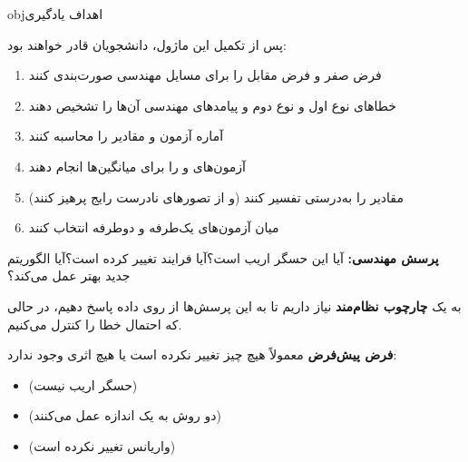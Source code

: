 \begin{PSbox}[unbreakable]{obj}{اهداف یادگیری}

پس از تکمیل این ماژول، دانشجویان قادر خواهند بود:

\begin{enumerate}
\def\labelenumi{\arabic{enumi}.}
\tightlist
\item
  فرض صفر و فرض مقابل را برای مسایل مهندسی صورت‌بندی کنند
\item
  خطاهای نوع اول و نوع دوم و پیامدهای مهندسی آن‌ها را تشخیص دهند
\item
  آماره آزمون و مقادیر  را محاسبه کنند
\item
  آزمون‌های  و  را برای میانگین‌ها انجام دهند
\item
  مقادیر  را به‌درستی تفسیر کنند (و از تصورهای نادرست رایج پرهیز کنند)
\item
  میان آزمون‌های یک‌طرفه و دوطرفه انتخاب کنند
\end{enumerate}

\end{PSbox}


\textbf{پرسش مهندسی:} آیا این حسگر اریب است؟آیا فرایند تغییر کرده است؟آیا الگوریتم جدید بهتر عمل می‌کند؟

به یک \textbf{چارچوب نظام‌مند} نیاز داریم تا به این پرسش‌ها از روی داده پاسخ دهیم، در حالی که احتمال خطا را کنترل می‌کنیم.



\textbf{فرض پیش‌فرض}  معمولاً هیچ چیز تغییر نکرده است یا هیچ اثری وجود ندارد:

\begin{itemize}
\tightlist
\item
   (حسگر اریب نیست)
\item
   (دو روش به یک اندازه عمل می‌کنند)
\item
   (واریانس تغییر نکرده است)
\end{itemize}


